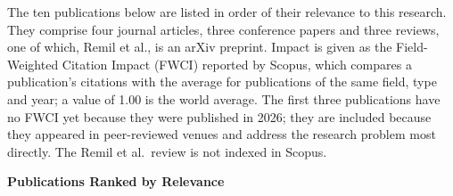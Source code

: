 The ten publications below are listed in order of their relevance to this research. They comprise four journal articles, three conference papers and three reviews, one of which, Remil et al., is an arXiv preprint. Impact is given as the Field-Weighted Citation Impact (FWCI) reported by Scopus, which compares a publication's citations with the average for publications of the same field, type and year; a value of 1.00 is the world average. The first three publications have no FWCI yet because they were published in 2026; they are included because they appeared in peer-reviewed venues and address the research problem most directly. The Remil et al.\ review is not indexed in Scopus.

\begin{center}\textbf{Publications Ranked by Relevance}\end{center}

